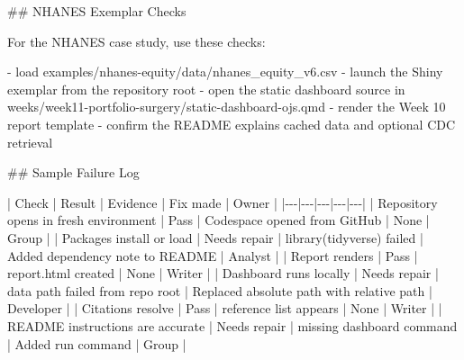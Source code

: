 \documentclass[
  letterpaper,
  DIV=11,
  numbers=noendperiod,
  oneside]{scrreprt}
\newenvironment{Shaded}{\begin{snugshade}}{\end{snugshade}}
\newcommand{\FunctionTok}[1]{\textcolor[rgb]{0.28,0.35,0.67}{#1}}
\newcommand{\InformationTok}[1]{\textcolor[rgb]{0.37,0.37,0.37}{#1}}
\newcommand{\NormalTok}[1]{\textcolor[rgb]{0.00,0.23,0.31}{#1}}
\newcommand{\PreprocessorTok}[1]{\textcolor[rgb]{0.68,0.00,0.00}{#1}}
\newcommand{\SpecialStringTok}[1]{\textcolor[rgb]{0.13,0.47,0.30}{#1}}
\begin{document}
\begin{Shaded}
\begin{Highlighting}[numbers=left,,]
\FunctionTok{\#\# NHANES Exemplar Checks}

\NormalTok{For the NHANES case study, use these checks:}

\SpecialStringTok{{-} }\NormalTok{load }\InformationTok{\textasciigrave{}examples/nhanes{-}equity/data/nhanes\_equity\_v6.csv\textasciigrave{}}
\SpecialStringTok{{-} }\NormalTok{launch the Shiny exemplar from the repository root}
\SpecialStringTok{{-} }\NormalTok{open the static dashboard source in }\InformationTok{\textasciigrave{}weeks/week11{-}portfolio{-}surgery/static{-}dashboard{-}ojs.qmd\textasciigrave{}}
\SpecialStringTok{{-} }\NormalTok{render the Week 10 report template}
\SpecialStringTok{{-} }\NormalTok{confirm the README explains cached data and optional CDC retrieval}

\FunctionTok{\#\# Sample Failure Log}

\PreprocessorTok{|}\NormalTok{ Check }\PreprocessorTok{|}\NormalTok{ Result }\PreprocessorTok{|}\NormalTok{ Evidence }\PreprocessorTok{|}\NormalTok{ Fix made }\PreprocessorTok{|}\NormalTok{ Owner }\PreprocessorTok{|}
\PreprocessorTok{|{-}{-}{-}|{-}{-}{-}|{-}{-}{-}|{-}{-}{-}|{-}{-}{-}|}
\PreprocessorTok{|}\NormalTok{ Repository opens in fresh environment }\PreprocessorTok{|}\NormalTok{ Pass }\PreprocessorTok{|}\NormalTok{ Codespace opened from GitHub }\PreprocessorTok{|}\NormalTok{ None }\PreprocessorTok{|}\NormalTok{ Group }\PreprocessorTok{|}
\PreprocessorTok{|}\NormalTok{ Packages install or load }\PreprocessorTok{|}\NormalTok{ Needs repair }\PreprocessorTok{|} \InformationTok{\textasciigrave{}library(tidyverse)\textasciigrave{}}\NormalTok{ failed }\PreprocessorTok{|}\NormalTok{ Added dependency note to README }\PreprocessorTok{|}\NormalTok{ Analyst }\PreprocessorTok{|}
\PreprocessorTok{|}\NormalTok{ Report renders }\PreprocessorTok{|}\NormalTok{ Pass }\PreprocessorTok{|} \InformationTok{\textasciigrave{}report.html\textasciigrave{}}\NormalTok{ created }\PreprocessorTok{|}\NormalTok{ None }\PreprocessorTok{|}\NormalTok{ Writer }\PreprocessorTok{|}
\PreprocessorTok{|}\NormalTok{ Dashboard runs locally }\PreprocessorTok{|}\NormalTok{ Needs repair }\PreprocessorTok{|}\NormalTok{ data path failed from repo root }\PreprocessorTok{|}\NormalTok{ Replaced absolute path with relative path }\PreprocessorTok{|}\NormalTok{ Developer }\PreprocessorTok{|}
\PreprocessorTok{|}\NormalTok{ Citations resolve }\PreprocessorTok{|}\NormalTok{ Pass }\PreprocessorTok{|}\NormalTok{ reference list appears }\PreprocessorTok{|}\NormalTok{ None }\PreprocessorTok{|}\NormalTok{ Writer }\PreprocessorTok{|}
\PreprocessorTok{|}\NormalTok{ README instructions are accurate }\PreprocessorTok{|}\NormalTok{ Needs repair }\PreprocessorTok{|}\NormalTok{ missing dashboard command }\PreprocessorTok{|}\NormalTok{ Added run command }\PreprocessorTok{|}\NormalTok{ Group }\PreprocessorTok{|}


\end{Highlighting}
\end{Shaded}
\end{document}
